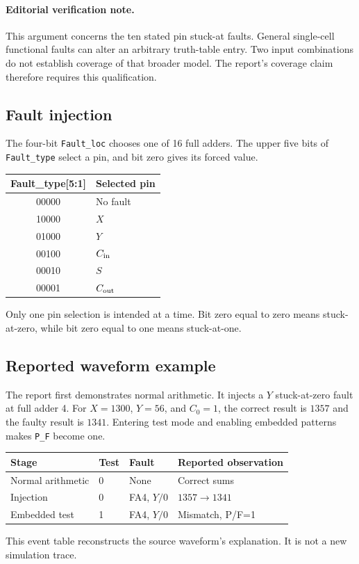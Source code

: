 \documentclass[11pt,a4paper]{article}
\newcommand{\bits}[1]{\texttt{#1}}
\begin{document}
\paragraph{Editorial verification note.}
This argument concerns the ten stated pin stuck-at faults. General single-cell functional faults can alter an arbitrary truth-table entry. Two input combinations do not establish coverage of that broader model. The report's coverage claim therefore requires this qualification.

\subsection{Fault injection}
The four-bit \bits{Fault\_loc} chooses one of 16 full adders. The upper five bits of \bits{Fault\_type} select a pin, and bit zero gives its forced value.
\begin{center}\begin{tabular}{cl}
\toprule Fault\_type[5:1]&Selected pin\\\midrule
00000&No fault\\10000&$X$\\01000&$Y$\\00100&$C_{\rm in}$\\00010&$S$\\00001&$C_{\rm out}$\\
\bottomrule\end{tabular}\end{center}
Only one pin selection is intended at a time. Bit zero equal to zero means stuck-at-zero, while bit zero equal to one means stuck-at-one.

\subsection{Reported waveform example}
The report first demonstrates normal arithmetic. It injects a $Y$ stuck-at-zero fault at full adder 4. For $X=1300$, $Y=56$, and $C_0=1$, the correct result is $1357$ and the faulty result is $1341$. Entering test mode and enabling embedded patterns makes \bits{P\_F} become one.
\begin{center}\begin{tabular}{llll}
\toprule Stage&Test&Fault&Reported observation\\\midrule
Normal arithmetic&0&None&Correct sums\\
Injection&0&FA4, $Y/0$&$1357\longrightarrow1341$\\
Embedded test&1&FA4, $Y/0$&Mismatch, P/F=1\\
\bottomrule\end{tabular}\end{center}
This event table reconstructs the source waveform's explanation. It is not a new simulation trace.
\end{document}
